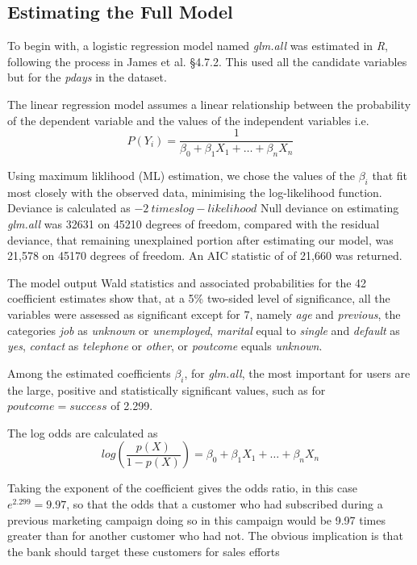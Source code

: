 \documentclass[9pt,technote]{IEEEtran}
\begin{document}
\subsection{Estimating the Full Model}

To begin with, a logistic regression model named \textit{glm.all} was estimated in \textit{R}, following the process in James et al. \cite{hastie21} \S 4.7.2.  This used  all the candidate variables but for the \textit{pdays} in the dataset.  

The linear regression model assumes a linear relationship between the probability of the dependent variable and the values of the independent variables i.e.
\begin{equation}
P(Y_i) = \frac{1}{\beta_0 + \beta_1 X_1 + \dots +\beta_n X_n}
\end{equation}

Using maximum liklihood (ML) estimation, we chose the values of the $\beta_i$ that fit most closely with the observed data, minimising the log-likelihood function.  Deviance is calculated as $-2 \ times log-likelihood$
Null deviance on estimating \textit{glm.all} was 32631 on 45210  degrees of freedom, compared with the residual deviance, that remaining unexplained portion after estimating our model, was 21,578 on 45170 degrees of freedom.  An AIC statistic of of 21,660 was returned.  

The model output Wald statistics and associated probabilities for the 42 coefficient estimates show that, at a 5\% two-sided level of significance, all the variables were assessed as significant except for 7, namely \textit{age} and \textit{previous}, the categories \textit{job} as \textit{unknown} or \textit{unemployed}, \textit{marital} equal to \textit{single} and \textit{default} as \textit{yes}, \textit{contact} as \textit{telephone} or \textit{other}, or \textit{poutcome} equals \textit{unknown}. 

Among the estimated coefficients $\beta_i$, for \textit{glm.all}, the most important for users are the large, positive and statistically significant values, such as for $poutcome=success$ of 2.299.  

The log odds are calculated as 
\begin{equation}
log\left(\frac{p(X)}{1-p(X)}\right) = \beta_0 + \beta_1 X_1 + \dots +\beta_n X_n
\end{equation}

Taking the exponent of the coefficient gives the odds ratio, in this case $e^{2.299} = 9.97$, so that the odds that a customer who had subscribed during a previous marketing campaign doing so in this campaign would be 9.97 times greater than for another customer who had not.  The obvious implication is that the bank should target these customers for sales efforts
\end{document}
